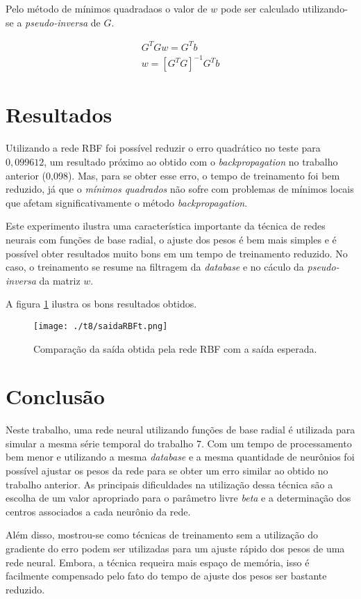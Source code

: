 \documentclass[10pt,journal,letterpaper,compsoc]{IEEEtran}
\begin{document}
 Pelo método de mínimos quadradaos o valor de $w$ pode ser calculado utilizando-se a {\it pseudo-inversa}
de $G$.

\begin{eqnarray}
G^TGw = G^Tb \\
w = [G^TG]^{-1}G^Tb
\end{eqnarray} 

\section{Resultados}

Utilizando a rede RBF foi possível reduzir o erro quadrático 
no teste para $0,099612$, um resultado próximo ao 
obtido com o {\it backpropagation} no trabalho anterior (0,098). Mas, para se 
obter esse erro, o tempo de treinamento
foi bem reduzido, já que o {\it mínimos quadrados} não sofre com problemas de mínimos locais que afetam
significativamente o método {\it backpropagation}.

Este experimento ilustra uma característica importante da técnica de redes neurais com funções de base radial,
o ajuste dos pesos é bem mais simples e é possível obter resultados muito bons em um tempo de treinamento 
reduzido.
No caso, o treinamento se resume na filtragem da {\it database} e no cáculo da {\it pseudo-inversa} da matriz $w$.

A figura \ref{erro.1} ilustra os bons resultados obtidos.

\begin{figure}[!htb]
     \centering
     \texttt{[image: ./t8/saidaRBFt.png]}
     \caption{Comparação da saída obtida pela rede RBF com a saída esperada.}
     \label{erro.1}
\end{figure}


\section{Conclusão}
Neste trabalho, uma rede neural utilizando funções de base radial é utilizada para simular a mesma série temporal
do trabalho 7. Com um tempo de processamento bem menor e utilizando a mesma {\it database} e a mesma quantidade 
de neurônios foi possível ajustar os pesos da rede para se obter um erro similar ao obtido no trabalho anterior.
As principais dificuldades na utilização dessa técnica são a escolha de um valor apropriado para o parâmetro livre
{\it beta} e a determinação dos centros associados a cada neurônio da rede.

Além disso, mostrou-se como técnicas de treinamento sem a utilização do gradiente do erro podem ser utilizadas
para um ajuste rápido dos pesos de uma rede neural. Embora, a técnica requeira mais espaço de memória, isso é
facilmente compensado pelo fato do tempo de ajuste dos pesos ser bastante reduzido.
\end{document}
